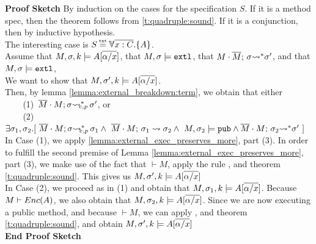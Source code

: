 \label{s:app:proof:sketch;overall}
 {\textbf{Proof Sketch}}
 By induction on the  cases for the specification $S$. If it is a method spec, then the theorem follows from \ref{t:quadruple:sound}. If it is a conjunction, then by inductive hypothesis.
 \\
 The interesting case is $S \txteq {\TwoStatesN {\overline {x:C}} {A}}$.
 \\
 Assume that 
 $ M,\sigma ,{k} \models {A} [\overline {\alpha/x} ]$, that  $M,\sigma \models \mbox{\normalfont{\texttt{extl}}}$,
 that $M\cdot \overline{M};\, {\sigma} {\rightsquigarrow^*} \sigma'$, and that $M,\sigma \models \mbox{\normalfont{\texttt{extl}}}$,
 \\ 
 We want to show that $ M,\sigma' ,{k} \models {A} [\overline {\alpha/x} ]$.
 \\
 Then, by lemma
 \ref{lemma:external_breakdown:term}, we obtain that either \\
$\strut \ \ \ \ \ $ (1)\  $\overline{M}\cdot M; \sigma {\rightsquigarrow^*}\!\!\!\!_{e,p}\, \sigma'$, or\\
$\strut \ \ \ \ \ $  (2)\  $\exists \sigma_1,\sigma_2.[\
\leadstoBoundedExtPub {\Mtwo\cdot M}    {\sigma}  {\sigma_1}
\wedge\ \leadstoBounded  {\Mtwo\cdot M}    {\sigma_1}  {\sigma_2}
\wedge \ M, \sigma_2 \models \pubMeth \wedge \leadstoBoundedStar  {\Mtwo\cdot M}    {\sigma_2}  {\sigma'} \ ]$
\\
In Case (1), we apply  \ref{lemma:external_exec_preserves_more}, part (3).  In order to fulfill the second premise of Lemma  \ref{lemma:external_exec_preserves_more}, part (3), we make use of the fact that $\vdash M$,   apply the rule {}, and theorem \ref{t:quadruple:sound}.
This gives us $ M,\sigma' ,{k} \models {A} [\overline {\alpha/x} ]$
\\
In Case (2), we proceed as in (1) and obtain that $ M,\sigma_1 ,{k} \models {A} [\overline {\alpha/x} ]$. Because $M \vdash {\ensuremath Enc( A )}$, we also obtain that 
$ M,\sigma_2 ,{k} \models {A} [\overline {\alpha/x} ]$.
Since we are now executing a public method, and because $\vdash M$, we can apply {}, and theorem \ref{t:quadruple:sound}, and obtain $ M,\sigma' ,{k} \models {A} [\overline {\alpha/x} ]$\\
 \vspace{.1cm}
  {\textbf{End Proof Sketch}} 